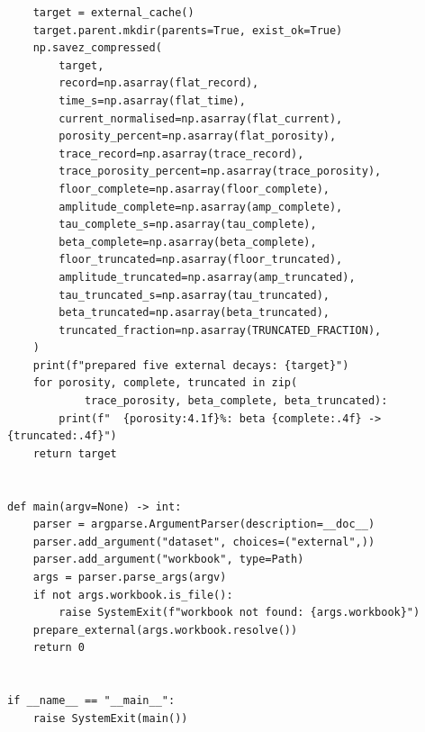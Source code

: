 \documentclass[a4paper,10pt]{article}
\begin{document}
\begin{Verbatim}
    target = external_cache()
    target.parent.mkdir(parents=True, exist_ok=True)
    np.savez_compressed(
        target,
        record=np.asarray(flat_record),
        time_s=np.asarray(flat_time),
        current_normalised=np.asarray(flat_current),
        porosity_percent=np.asarray(flat_porosity),
        trace_record=np.asarray(trace_record),
        trace_porosity_percent=np.asarray(trace_porosity),
        floor_complete=np.asarray(floor_complete),
        amplitude_complete=np.asarray(amp_complete),
        tau_complete_s=np.asarray(tau_complete),
        beta_complete=np.asarray(beta_complete),
        floor_truncated=np.asarray(floor_truncated),
        amplitude_truncated=np.asarray(amp_truncated),
        tau_truncated_s=np.asarray(tau_truncated),
        beta_truncated=np.asarray(beta_truncated),
        truncated_fraction=np.asarray(TRUNCATED_FRACTION),
    )
    print(f"prepared five external decays: {target}")
    for porosity, complete, truncated in zip(
            trace_porosity, beta_complete, beta_truncated):
        print(f"  {porosity:4.1f}%: beta {complete:.4f} -> {truncated:.4f}")
    return target


def main(argv=None) -> int:
    parser = argparse.ArgumentParser(description=__doc__)
    parser.add_argument("dataset", choices=("external",))
    parser.add_argument("workbook", type=Path)
    args = parser.parse_args(argv)
    if not args.workbook.is_file():
        raise SystemExit(f"workbook not found: {args.workbook}")
    prepare_external(args.workbook.resolve())
    return 0


if __name__ == "__main__":
    raise SystemExit(main())
\end{Verbatim}
\end{document}
